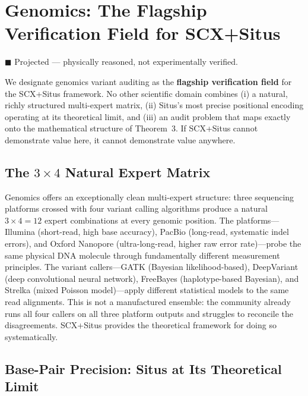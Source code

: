 \documentclass[12pt,a4paper]{article}
\begin{document}
\section{Genomics: The Flagship Verification Field for SCX+Situs}
\label{sec:genomics}

\textcolor{projected}{$\blacksquare$ Projected — physically reasoned, not experimentally verified.}

We designate genomics variant auditing as the \textbf{flagship verification field} for the SCX+Situs framework. No other scientific domain combines (i) a natural, richly structured multi-expert matrix, (ii) Situs's most precise positional encoding operating at its theoretical limit, and (iii) an audit problem that maps exactly onto the mathematical structure of Theorem~3. If SCX+Situs cannot demonstrate value here, it cannot demonstrate value anywhere.

\subsection{The $3 \times 4$ Natural Expert Matrix}

Genomics offers an exceptionally clean multi-expert structure: three sequencing platforms crossed with four variant calling algorithms produce a natural $3 \times 4 = 12$ expert combinations at every genomic position. The platforms---Illumina (short-read, high base accuracy), PacBio (long-read, systematic indel errors), and Oxford Nanopore (ultra-long-read, higher raw error rate)---probe the same physical DNA molecule through fundamentally different measurement principles. The variant callers---GATK\cite{depristo2011} (Bayesian likelihood-based), DeepVariant\cite{poplin2018} (deep convolutional neural network), FreeBayes\cite{garrison2012} (haplotype-based Bayesian), and Strelka\cite{kim2018} (mixed Poisson model)---apply different statistical models to the same read alignments. This is not a manufactured ensemble: the community already runs all four callers on all three platform outputs and struggles to reconcile the disagreements. SCX+Situs provides the theoretical framework for doing so systematically.

\subsection{Base-Pair Precision: Situs at Its Theoretical Limit}
\end{document}
